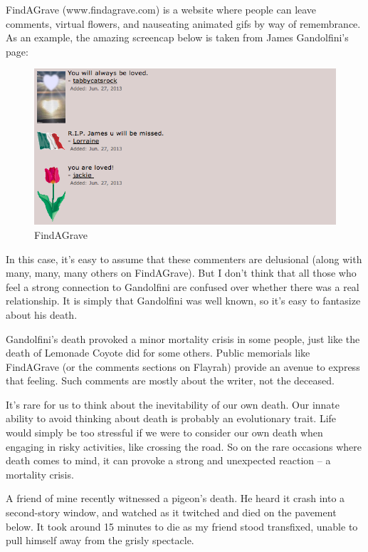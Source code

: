 FindAGrave (www.findagrave.com) is a website where people can leave comments, virtual flowers, and nauseating animated gifs by way of remembrance. As an example, the amazing screencap below is taken from James Gandolfini's page:

\begin{figure}
  \begin{center}
    \includegraphics[width=\textwidth]{content/assets/mortality--grave}
  \end{center}
  \caption{FindAGrave}
\end{figure}

In this case, it's easy to assume that these commenters are delusional (along with many, many, many others on FindAGrave). But I don't think that all those who feel a strong connection to Gandolfini are confused over whether there was a real relationship. It is simply that Gandolfini was well known, so it's easy to fantasize about his death.

Gandolfini's death provoked a minor mortality crisis in some people, just like the death of Lemonade Coyote did for some others. Public memorials like FindAGrave (or the comments sections on Flayrah) provide an avenue to express that feeling. Such comments are mostly about the writer, not the deceased.

It's rare for us to think about the inevitability of our own death. Our innate ability to avoid thinking about death is probably an evolutionary trait. Life would simply be too stressful if we were to consider our own death when engaging in risky activities, like crossing the road. So on the rare occasions where death comes to mind, it can provoke a strong and unexpected reaction -- a mortality crisis.

A friend of mine recently witnessed a pigeon's death. He heard it crash into a second-story window, and watched as it twitched and died on the pavement below. It took around 15 minutes to die as my friend stood transfixed, unable to pull himself away from the grisly spectacle.

